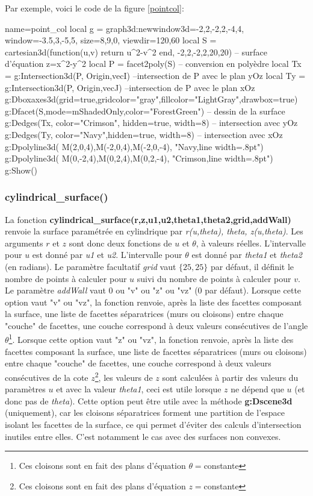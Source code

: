Par exemple, voici le code de la figure \ref{pointcol}:
\begin{Luacode}
\begin{luadraw}{name=point_col}
local g = graph3d:new{window3d={-2,2,-2,2,-4,4}, window={-3.5,3,-5,5}, size={8,9,0}, viewdir={120,60}}
local S = cartesian3d(function(u,v) return u^2-v^2 end, -2,2,-2,2,{20,20}) -- surface d'équation z=x^2-y^2
local P = facet2poly(S) -- conversion en polyèdre
local Tx = g:Intersection3d(P, {Origin,vecI}) --intersection de P avec le plan yOz
local Ty = g:Intersection3d(P, {Origin,vecJ}) --intersection de P avec le plan xOz
g:Dboxaxes3d({grid=true,gridcolor="gray",fillcolor="LightGray",drawbox=true})
g:Dfacet(S,{mode=mShadedOnly,color="ForestGreen"}) -- dessin de la surface
g:Dedges(Tx, {color="Crimson", hidden=true, width=8}) -- intersection avec yOz
g:Dedges(Ty, {color="Navy",hidden=true, width=8}) -- intersection avec xOz
g:Dpolyline3d( {M(2,0,4),M(-2,0,4),M(-2,0,-4)}, "Navy,line width=.8pt")
g:Dpolyline3d( {M(0,-2,4),M(0,2,4),M(0,2,-4)}, "Crimson,line width=.8pt")
g:Show()
\end{luadraw}
\end{Luacode}

\subsubsection{cylindrical\_surface()}

La fonction \textbf{cylindrical\_surface(r,z,u1,u2,theta1,theta2,grid,addWall)} renvoie la surface paramétrée en cylindrique par \emph{r(u,theta), theta, z(u,theta)}. Les arguments $r$ et $z$ sont donc deux fonctions de $u$ et $\theta$, à valeurs réelles. L'intervalle pour $u$ est donné par \emph{u1} et \emph{u2}. L'intervalle pour $\theta$ est donné par \emph{theta1} et \emph{theta2} (en radians). Le paramètre facultatif \emph{grid} vaut $\{25,25\}$ par défaut, il définit le nombre de points à calculer pour $u$ suivi du nombre de points à calculer pour $v$. Le paramètre \emph{addWall} vaut 0 ou "v"  ou "z" ou "vz" (0 par défaut). Lorsque cette option vaut "v" ou "vz", la fonction renvoie, après la liste des facettes composant la surface, une liste de facettes séparatrices (murs ou cloisons) entre chaque "couche" de facettes, une couche correspond à deux valeurs consécutives de l'angle $\theta$\footnote{Ces cloisons sont en fait des plans d'équation $\theta=$constante}. Lorsque cette option vaut "z" ou "vz", la fonction renvoie, après la liste des facettes composant la surface, une liste de facettes séparatrices (murs ou cloisons) entre chaque "couche" de facettes, une couche correspond à deux valeurs consécutives de la cote $z$\footnote{Ces cloisons sont en fait des plans d'équation $z=$constante}, les valeurs de $z$ sont calculées à  partir des valeurs du paramètres $u$ et avec la valeur \emph{theta1}, ceci est utile lorsque $z$ ne dépend que $u$ (et donc pas de \emph{theta}). Cette option peut être utile avec la méthode \textbf{g:Dscene3d} (uniquement), car les cloisons séparatrices forment une partition de l'espace isolant les facettes de la surface, ce qui permet d'éviter des calculs d'intersection inutiles entre elles. C'est notamment le cas avec des surfaces non convexes.

